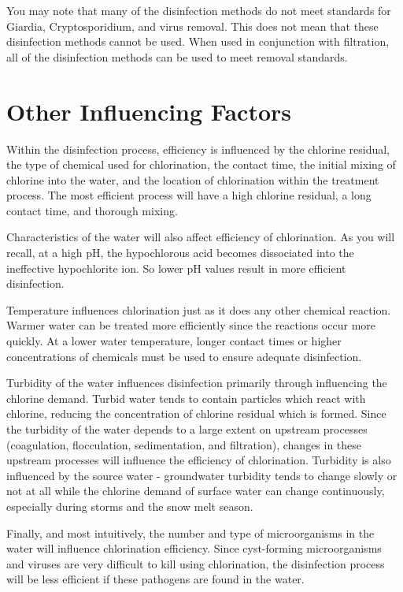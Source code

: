 \documentclass[10pt]{article}
\begin{document}
You may note that many of the disinfection methods do not meet standards for Giardia, Cryptosporidium, and virus removal. This does not mean that these disinfection methods cannot be used. When used in conjunction with filtration, all of the disinfection methods can be used to meet removal standards.

\section{Other Influencing Factors}
Within the disinfection process, efficiency is influenced by the chlorine residual, the type of chemical used for chlorination, the contact time, the initial mixing of chlorine into the water, and the location of chlorination within the treatment process. The most efficient process will have a high chlorine residual, a long contact time, and thorough mixing.

Characteristics of the water will also affect efficiency of chlorination. As you will recall, at a high $\mathrm{pH}$, the hypochlorous acid becomes dissociated into the ineffective hypochlorite ion. So lower $\mathrm{pH}$ values result in more efficient disinfection.

Temperature influences chlorination just as it does any other chemical reaction. Warmer water can be treated more efficiently since the reactions occur more quickly. At a lower water temperature, longer contact times or higher concentrations of chemicals must be used to ensure adequate disinfection.

Turbidity of the water influences disinfection primarily through influencing the chlorine demand. Turbid water tends to contain particles which react with chlorine, reducing the concentration of chlorine residual which is formed. Since the turbidity of the water depends to a large extent on upstream processes (coagulation, flocculation, sedimentation, and filtration), changes in these upstream processes will influence the efficiency of chlorination. Turbidity is also influenced by the source water - groundwater turbidity tends to change slowly or not at all while the chlorine demand of surface water can change continuously, especially during storms and the snow melt season.

Finally, and most intuitively, the number and type of microorganisms in the water will influence chlorination efficiency. Since cyst-forming microorganisms and viruses are very difficult to kill using chlorination, the disinfection process will be less efficient if these pathogens are found in the water.
\end{document}
